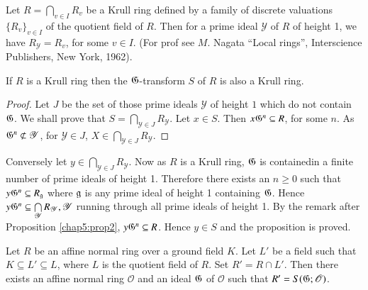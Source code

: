 \begin{rem}%
  Let $R = \bigcap\limits_{v \in I} R_{v}$  be a Krull ring defined
  by  a family of  discrete  valuations  $\{R_{v}\}_{v \in I}$  
  of  the  quotient field of $R$. Then for a   prime ideal
  $\mathscr{Y}$  of $R$ of height 1, we have $R_{\mathscr{Y}}  =
  R_{v}$, for some  $v \in I$. (For  prof  see $M$. Nagata ``Local
  rings'', Interscience Publishers, New York, 1962). 
\end{rem}
  
\begin{proposition}\label{chap5:prop3} %
  If  $R$ is a Krull ring then the $\mathfrak{G}$-transform $S$ of
  $R$  is  also  a Krull ring. 
 \end{proposition} 

\begin{proof}
  Let  $J$ be  the  set of  those prime  ideals  $\mathscr{Y}$ of
  height  $1$ which  do not  contain  $\mathfrak{G}$. We  shall prove
  that $ S = \bigcap\limits_{\mathscr{Y}\in J} R_{\mathscr{Y}}$. Let
  $x \in S$. Then $x \mathfrak{G}^{n} \subseteq  R$, 
  for  some  $n$. As  $ \mathfrak{G}^{n} \not\subset  \mathscr{Y}$,
  for  $\mathscr{Y} \in  J$, $X \in \bigcap\limits_{\mathscr{Y} \in J}
  R_{\mathscr{Y}}$.  
 \end{proof}

 \noindent Conversely let $y \in \bigcap\limits_{\mathscr{Y} \in J}
 R_{\mathscr{Y}}$. Now as $R$ is a Krull ring, $\mathfrak{G}$ is
 contained\pageoriginale in a finite number  of prime ideals  of
 height 1. Therefore there exists an $n \ge 0 $  such  that $y
 \mathfrak{G}^{n} \subseteq R_{\mathfrak{g}}$ where $\mathfrak{g}$ is any
 prime ideal of height 1 containing  $\mathfrak{G}$.  Hence $y \mathfrak{G}^{n} \subseteq
 \bigcap\limits_{\mathscr{Y}} R_{\mathscr{Y}}, \mathscr{Y}$ running
 through all prime ideals  of height 1. By the remark  after
 Proposition \ref{chap5:prop2}, $y \mathfrak{G}^n \subseteq R$. Hence  $y \in S$  and
 the proposition is proved. 
   
\begin{proposition}\label{chap5:prop4}%
  Let  $R$ be an  affine  normal  ring  over  a ground  field
  $K$. Let $L'$ be a field such that  $K \subseteq  L' \subseteq L$,
  where  $L$ is  the quotient  field of $R$. Set $R' = R \cap
  L'$. Then there  exists an affine normal ring  $\mathscr{O}$  and an
  ideal  $\mathfrak{G}$ of $\mathscr{O}$  such that  $R' = S
  (\mathfrak{G} ; \mathscr{O})$. 
\end{proposition}

